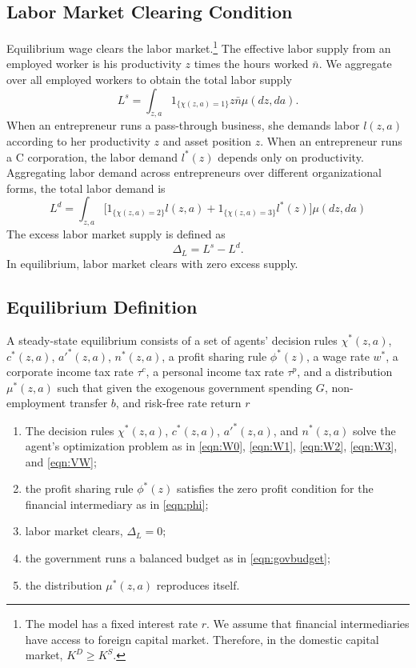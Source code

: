 \documentclass[12pt]{article}
\begin{document}
\subsection{Labor Market Clearing Condition}
Equilibrium wage clears the labor market.\footnote{The model has a fixed interest rate $r$. We assume that financial intermediaries have access to foreign capital market. Therefore, in the domestic capital market, $K^D\geq K^S$.} The effective labor supply from an employed worker is his productivity $z$ times the hours worked $\bar{n}$. We aggregate over all employed workers to obtain the total labor supply 
\begin{equation*}
L^s=\int_{z,a} 1_{\{\chi(z,a)=1\}} z\bar{n}\mu(dz,da).
\end{equation*}
When an entrepreneur runs a pass-through business, she demands labor $l(z,a)$ according to her productivity $z$ and asset position $z$. When an entrepreneur runs a C corporation, the labor demand $l^*(z)$ depends only on productivity. Aggregating labor demand across entrepreneurs over different organizational forms, the total labor demand is 
\begin{equation*}
L^d=\int_{z,a} \bigg[ 1_{\{\chi(z,a)=2\}} l(z,a)
+1_{\{\chi(z,a)=3\}} l^*(z)\bigg] \mu(dz,da)
\end{equation*}
The excess labor market supply is defined as 
\begin{equation}
\Delta_L=L^s-L^d  \label{eqn:deltaL}.
\end{equation}
In equilibrium, labor market clears with zero excess supply. 


\subsection{Equilibrium Definition}

A steady-state equilibrium consists of a set of agents' decision rules $\chi^*(z,a)$, $c^*(z,a)$, $a'^*(z,a)$, $n^*(z,a)$, a profit sharing rule $\phi^*(z)$, a wage rate $w^*$, a corporate income tax rate $\tau^c$, a personal income tax rate $\tau^p$, and a distribution $\mu^*(z,a)$ such that given the exogenous government spending $G$, non-employment transfer $b$, and risk-free rate return $r$
\begin{enumerate}
\item The decision rules $\chi^*(z,a)$, $c^*(z,a)$, $a'^*(z,a)$, and $n^*(z,a)$ solve the agent's optimization problem as in \eqref{eqn:W0}, \eqref{eqn:W1}, \eqref{eqn:W2}, \eqref{eqn:W3}, and \eqref{eqn:VW}; 
\item the profit sharing rule $\phi^*(z)$ satisfies the zero profit condition for the financial intermediary as in \eqref{eqn:phi};
\item labor market clears, $\Delta_L=0$; %
\item the government runs a balanced budget as in \eqref{eqn:govbudget};
\item the distribution $\mu^*(z,a)$ reproduces itself.
\end{enumerate}
\end{document}
